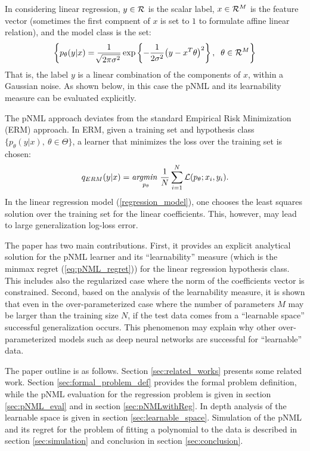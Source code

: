 \documentclass[conference,letterpaper]{IEEEtran}
\begin{document}
In considering linear regression, $y\in {\cal R}$ is the scalar label, $x\in {\cal R}^M$ is the feature vector (sometimes the first compnent of $x$ is set to $1$ to formulate affine linear relation), and the model class is the set:
\begin{equation} \label{regression_model}
\left\{ p_{\theta}(y|x) 
=\frac{1}{\sqrt[]{2\pi\sigma^2}}\exp\left\{-\frac{1}{2\sigma^2}\big(y- x^T\theta \big)^2\right\}, \;\; \theta \in {\cal R}^M \right\} 
\end{equation}
That is, the label $y$ is a linear combination of the components of $x$, within a Gaussian noise. As shown below, in this case the pNML and its learnability measure can be evaluated explicitly.

The pNML approach deviates from the standard Empirical Risk Minimization (ERM) \cite{vapnik1992principles} approach.
In ERM, given a training set and hypothesis class $\{p_\theta(y|x),\ \theta \in \Theta\}$, a learner that minimizes the loss over the training set is chosen:
\begin{equation}
q_{\mbox{\tiny{ERM}}}(y|x) = \underset{p_\theta}{\textit{argmin }} \frac{1}{N}\sum_{i=1}^{N}  \mathcal{L}(p_\theta; x_i, y_i).
\end{equation}
In the linear regression model (\ref{regression_model}), one chooses the least squares solution over the training set for the linear coefficients. This, however, may lead to large generalization log-loss error.

The paper has two main contributions.
First, it provides an explicit analytical solution for the pNML learner and its ``learnability'' measure (which is the minmax regret (\ref{eq:pNML_regret})) for the linear regression hypothesis class. This includes also the regularized case where the norm of the coefficients vector is constrained. Second, based on the analysis of the learnability measure, it is shown that even in the over-parameterized case where the number of parameters $M$ may be larger than the training size $N$, if the test data comes from a ``learnable space'' successful generalization occurs.
This phenomenon may explain why other over-parameterized models such as deep neural networks are successful for ``learnable'' data.

The paper outline is as follows.
Section \ref{sec:related_works} presents some related work. Section \ref{sec:formal_problem_def} provides the formal problem definition, while the pNML evaluation for the regression problem is given in section \ref{sec:pNML_eval} and in section \ref{sec:pNMLwithReg}. In depth analysis of the learnable space is given in section \ref{sec:learnable_space}. Simulation of the pNML and its regret for the problem of fitting a polynomial to the data is described in section \ref{sec:simulation} and conclusion in section \ref{sec:conclusion}.
\end{document}

